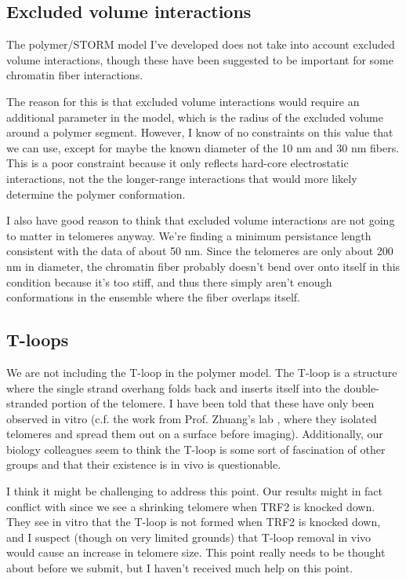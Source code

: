 \documentclass[11pt]{article}
\begin{document}
\subsection{Excluded volume interactions}
\label{sec-5-1}
The polymer/STORM model I've developed does not take into account
excluded volume interactions, though these have been suggested to be
important for some chromatin fiber interactions.

The reason for this is that excluded volume interactions would require
an additional parameter in the model, which is the radius of the
excluded volume around a polymer segment. However, I know of no
constraints on this value that we can use, except for maybe the known
diameter of the 10 nm and 30 nm fibers. This is a poor constraint
because it only reflects hard-core electrostatic interactions, not the
the longer-range interactions that would more likely determine the
polymer conformation.

I also have good reason to think that excluded volume interactions are
not going to matter in telomeres anyway. We're finding a minimum
persistance length consistent with the data of about 50 nm. Since the
telomeres are only about 200 nm in diameter, the chromatin fiber
probably doesn't bend over onto itself in this condition because it's
too stiff, and thus there simply aren't enough conformations in the
ensemble where the fiber overlaps itself.

\subsection{T-loops}
\label{sec-5-2}
We are not including the T-loop in the polymer model. The T-loop is a
structure where the single strand overhang folds back and inserts
itself into the double-stranded portion of the telomere. I have been
told that these have only been observed in vitro (c.f. the work from
Prof. Zhuang's lab \cite{doksani-cell-2013}, where they isolated
telomeres and spread them out on a surface before
imaging). Additionally, our biology colleagues seem to think the
T-loop is some sort of fascination of other groups and that their
existence is in vivo is questionable.

I think it might be challenging to address this point. Our results
might in fact conflict with \cite{doksani-cell-2013} since we see a
shrinking telomere when TRF2 is knocked down. They see in vitro that
the T-loop is not formed when TRF2 is knocked down, and I suspect
(though on very limited grounds) that T-loop removal in vivo would
cause an increase in telomere size. This point really needs to be
thought about before we submit, but I haven't received much help on
this point.
\end{document}
